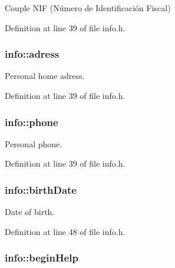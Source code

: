 Couple N\+I\+F (Número de Identificación Fiscal) 



Definition at line 39 of file info.\+h.

\hypertarget{structinfo_a589dff7ad548e9ac9a45f632539c9a0a}{
\subsubsection[{adress}]{\setlength{\rightskip}{0pt plus 5cm}info\+::adress}}\label{structinfo_a589dff7ad548e9ac9a45f632539c9a0a}


Personal home adress. 



Definition at line 39 of file info.\+h.

\hypertarget{structinfo_a716fe5520eb096be308dcd18f7cbd1c1}{
\subsubsection[{phone}]{\setlength{\rightskip}{0pt plus 5cm}info\+::phone}}\label{structinfo_a716fe5520eb096be308dcd18f7cbd1c1}


Personal phone. 



Definition at line 39 of file info.\+h.

\hypertarget{structinfo_a2269c62bc80419abee5ab99596715014}{
\subsubsection[{birth\+Date}]{\setlength{\rightskip}{0pt plus 5cm}info\+::birth\+Date}}\label{structinfo_a2269c62bc80419abee5ab99596715014}


Date of birth. 



Definition at line 48 of file info.\+h.

\hypertarget{structinfo_a860bf129937fda542024222bd425a224}{
\subsubsection[{begin\+Help}]{\setlength{\rightskip}{0pt plus 5cm}info\+::begin\+Help}}\label{structinfo_a860bf129937fda542024222bd425a224}


